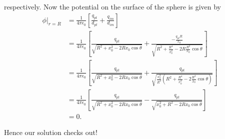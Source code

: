 respectively. Now the potential on the surface of the sphere is given by
\begin{align*}
\phi \Big|_{r=R} &= \frac{1}{4\pi\epsilon_0}\left[ \frac{q_{pt}}{d_{pt}} + \frac{q_{im}}{d_{im}}  \right]  \\
&= \frac{1}{4\pi\epsilon_0} \left[ \frac{q_{pt}}{\sqrt{R^2+x_0^2- 2Rx_0\cos\theta}} + \frac{-\frac{q_{pt}R}{x_0}}{\sqrt{R^2+\frac{R^4}{x_0^2} - 2R\frac{R^2}{x_0}\cos\theta}}  \right] \\
&= \frac{1}{4\pi\epsilon_0} \left[ \frac{q_{pt}}{\sqrt{R^2+x_0^2- 2Rx_0\cos\theta}} + \frac{q_{pt}}{\sqrt{ \frac{x_0^2}{R^2}\left( R^2+\frac{R^4}{x_0^2} - 2\frac{R^3}{x_0}\cos\theta  \right)           } }  \right] \\
&= \frac{1}{4\pi\epsilon_0} \left[ \frac{q_{pt}}{\sqrt{R^2+x_0^2- 2Rx_0\cos\theta}} - \frac{q_{pt}}{\sqrt{x_0^2+R^2 -2Rx_0\cos\theta}} \right] \\
&= 0.
\end{align*}

Hence our solution checks out!
